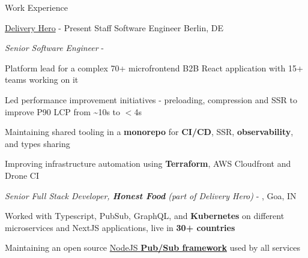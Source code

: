 \documentclass[../resume.tex]{subfiles}
\begin{document}
\begin{rSection}{Work Experience}

\begin{rSubsection}
    {\href{https://go.rohit.page/dh}{Delivery Hero}}
    {  - Present}
    {Staff Software Engineer}
    {Berlin, DE}
    \begin{rSubsectionHeading}
        {\normalfont \em Senior Software Engineer}
        {  - }
        {}{}
    \end{rSubsectionHeading}

    \item Platform lead for a complex 70+ microfrontend B2B React application with 15+ teams working on it
    \item Led performance improvement initiatives - preloading, compression and SSR to improve P90 LCP from \textasciitilde{}10s to $<$4s
    \item Maintaining shared tooling in a \textbf{monorepo} for \textbf{CI/CD}, SSR, \textbf{observability}, and types sharing
    \item Improving infrastructure automation using \textbf{Terraform}, AWS Cloudfront and Drone CI

    \begin{rSubsectionHeading}
        {\normalfont \em Senior Full Stack Developer, \textbf{Honest Food} (part of Delivery Hero)}
        {  - , Goa, IN}
        {}{}
    \end{rSubsectionHeading}

    \item Worked with Typescript, PubSub, GraphQL, and \textbf{Kubernetes} on different microservices and NextJS applications, live in \textbf{30+ countries}
    \item Maintaining an open source \href{https://go.rohit.page/hfc-pubsub}{NodeJS \textbf{Pub/Sub framework}} used by all services


\end{rSubsection}
\end{rSection}
\end{document}
